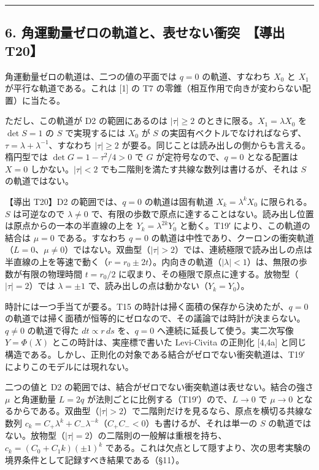\documentclass[
  a4paper,
]{ltjsarticle}
\begin{document}
\begin{center}\rule{0.5\linewidth}{0.5pt}\end{center}

\subsection{6. 角運動量ゼロの軌道と、表せない衝突　【導出
T20】}\label{ux89d2ux904bux52d5ux91cfux30bcux30edux306eux8eccux9053ux3068ux8868ux305bux306aux3044ux885dux7a81-ux5c0eux51fa-t20}

角運動量ゼロの軌道は、二つの値の平面では \(q=0\) の軌道、すなわち
\(X_0\) と \(X_1\) が平行な軌道である。これは {[}1{]} の T7
の零錐（相互作用で向きが変わらない配置）に当たる。

ただし、この軌道が D2 の範囲にあるのは \(\lvert\tau\rvert\ge2\)
のときに限る。\(X_1=\lambda X_0\) を \(\det S=1\) の \(S\)
で実現するには \(X_0\) が \(S\)
の実固有ベクトルでなければならず、\(\tau=\lambda+\lambda^{-1}\)、すなわち
\(\lvert\tau\rvert\ge2\)
が要る。同じことは読み出しの側からも言える。楕円型では
\(\det G=1-\tau^2/4>0\) で \(G\) が定符号なので、\(q=0\) となる配置は
\(X=0\) しかない。\(\lvert\tau\rvert<2\)
でも二階則を満たす共線な数列は書けるが、それは \(S\) の軌道ではない。

【導出 T20】D2 の範囲では、\(q=0\) の軌道は固有軌道 \(X_k=\lambda^kX_0\)
に限られる。\(S\) は可逆なので \(\lambda\neq0\)
で、有限の歩数で原点に達することはない。読み出し位置は原点からの一本の半直線の上を
\(Y_k=\lambda^{2k}Y_0\) と動く。T19′ により、この軌道の結合は \(\mu=0\)
である。すなわち \(q=0\)
の軌道は中性であり、クーロンの衝突軌道（\(L=0\)、\(\mu\neq0\)）ではない。双曲型（\(\lvert\tau\rvert>2\)）では、連続極限で読み出しの点は半直線の上を等速で動く（\(r=r_0\pm2t\)）。内向きの軌道（\(\lvert\lambda\rvert<1\)）は、無限の歩数が有限の物理時間
\(t=r_0/2\)
に収まり、その極限で原点に達する。放物型（\(\lvert\tau\rvert=2\)）では
\(\lambda=\pm1\) で、読み出しの点は動かない（\(Y_k=Y_0\)）。

時計には一つ手当てが要る。T15
の時計は掃く面積の保存から決めたが、\(q=0\)
の軌道では掃く面積が恒等的にゼロなので、その議論では時計が決まらない。\(q\neq0\)
の軌道で得た \(dt\propto r\,ds\) を、\(q=0\)
へ連続に延長して使う。実二次写像 \(Y=\Phi(X)\)
とこの時計は、実座標で書いた Levi-Civita の正則化 {[}4,4a{]}
と同じ構造である。しかし、正則化の対象である結合がゼロでない衝突軌道は、T19′
によりこのモデルには現れない。

二つの値と D2 の範囲では、結合がゼロでない衝突軌道は表せない。結合の強さ
\(\mu\) と角運動量 \(L=2q\) が法則ごとに比例する（T19′）ので、\(L\to0\)
で \(\mu\to0\)
となるからである。双曲型（\(\lvert\tau\rvert>2\)）で二階則だけを見るなら、原点を横切る共線な数列
\(c_k=C_+\lambda^k+C_-\lambda^{-k}\)（\(C_+C_-<0\)）も書けるが、それは単一の
\(S\)
の軌道ではない。放物型（\(\lvert\tau\rvert=2\)）の二階則の一般解は重根を持ち、\(c_k=(C_0+C_1k)(\pm1)^k\)
である。これは欠点として隠すより、次の思考実験の境界条件として記録すべき結果である（§11）。
\end{document}
